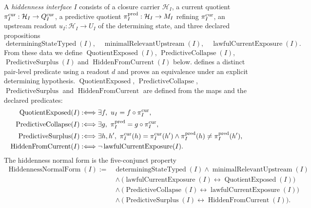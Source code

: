 \begin{definition}\label{def:hiddenness-exposure}
A \emph{hiddenness interface} \(I\) consists of a closure carrier
\(\mathcal H_I\), a current quotient
\(\pi^{\mathrm{cur}}_I:\mathcal H_I\to Q_I^{\mathrm{cur}}\), a predictive quotient
\(\pi^{\mathrm{pred}}_I:\mathcal H_I\to M_I\) refining \(\pi^{\mathrm{cur}}_I\), an upstream
readout \(u_I:\mathcal H_I\to U_I\) of the determining state, and three
declared propositions
\[
  \operatorname{determiningStateTyped}(I),\quad
  \operatorname{minimalRelevantUpstream}(I),\quad
  \operatorname{lawfulCurrentExposure}(I).
\]
From these data we define \(\operatorname{QuotientExposed}(I)\),
\(\operatorname{PredictiveCollapse}(I)\), \(\operatorname{PredictiveSurplus}(I)\)
and \(\operatorname{HiddenFromCurrent}(I)\) below.
 defines a
distinct pair-level predicate using a readout \(d\) and proves an equivalence
under an explicit determining hypothesis. \(\operatorname{QuotientExposed}\),
\(\operatorname{PredictiveCollapse}\), \(\operatorname{PredictiveSurplus}\) and
\(\operatorname{HiddenFromCurrent}\) are defined from the maps and the declared
predicates:
\begin{align*}
  \operatorname{QuotientExposed}(I)
  &:\Longleftrightarrow \exists f,\ u_I=f\circ\pi^{\mathrm{cur}}_I,\\
  \operatorname{PredictiveCollapse}(I)
  &:\Longleftrightarrow \exists g,\ \pi^{\mathrm{pred}}_I=g\circ\pi^{\mathrm{cur}}_I,\\
  \operatorname{PredictiveSurplus}(I)
  &:\Longleftrightarrow \exists h,h',\ \pi^{\mathrm{cur}}_I(h)=\pi^{\mathrm{cur}}_I(h')
    \wedge \pi^{\mathrm{pred}}_I(h)\ne\pi^{\mathrm{pred}}_I(h'),\\
  \operatorname{HiddenFromCurrent}(I)
  &:\Longleftrightarrow \neg\operatorname{lawfulCurrentExposure}(I).
\end{align*}
The hiddenness normal form is the
five-conjunct property
\begin{align*}
  \operatorname{HiddennessNormalForm}(I)
  :={}&
  \operatorname{determiningStateTyped}(I)
  \wedge
  \operatorname{minimalRelevantUpstream}(I)\\
  &{}\wedge
  \bigl(\operatorname{lawfulCurrentExposure}(I)
    \leftrightarrow
    \operatorname{QuotientExposed}(I)\bigr)\\
  &{}\wedge
  \bigl(\operatorname{PredictiveCollapse}(I)
    \leftrightarrow
    \operatorname{lawfulCurrentExposure}(I)\bigr)\\
  &{}\wedge
  \bigl(\operatorname{PredictiveSurplus}(I)
    \leftrightarrow
    \operatorname{HiddenFromCurrent}(I)\bigr).
\end{align*}
\end{definition}

